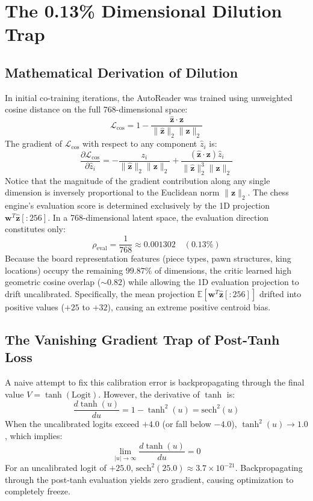 \documentclass[10pt,twocolumn]{article}
\begin{document}
\section{The 0.13\% Dimensional Dilution Trap}

\subsection{Mathematical Derivation of Dilution}
In initial co-training iterations, the AutoReader was trained using unweighted cosine distance on the full 768-dimensional space:
\begin{equation}
    \mathcal{L}_{\text{cos}} = 1 - \frac{\hat{\mathbf{z}} \cdot \mathbf{z}}{\|\hat{\mathbf{z}}\|_2 \|\mathbf{z}\|_2}
\end{equation}
The gradient of $\mathcal{L}_{\text{cos}}$ with respect to any component $\hat{z}_i$ is:
\begin{equation}
    \frac{\partial \mathcal{L}_{\text{cos}}}{\partial \hat{z}_i} = -\frac{z_i}{\|\hat{\mathbf{z}}\|_2 \|\mathbf{z}\|_2} + \frac{(\hat{\mathbf{z}} \cdot \mathbf{z}) \hat{z}_i}{\|\hat{\mathbf{z}}\|_2^3 \|\mathbf{z}\|_2}
\end{equation}
Notice that the magnitude of the gradient contribution along any single dimension is inversely proportional to the Euclidean norm $\|\mathbf{z}\|_2$. The chess engine's evaluation score is determined exclusively by the 1D projection $\mathbf{w}^T \hat{\mathbf{z}}[:256]$. In a 768-dimensional latent space, the evaluation direction constitutes only:
\begin{equation}
    \rho_{\text{eval}} = \frac{1}{768} \approx 0.001302 \quad (0.13\%)
\end{equation}
Because the board representation features (piece types, pawn structures, king locations) occupy the remaining $99.87\%$ of dimensions, the critic learned high geometric cosine overlap ($\sim 0.82$) while allowing the 1D evaluation projection to drift uncalibrated. Specifically, the mean projection $\mathbb{E}[\mathbf{w}^T \hat{\mathbf{z}}[:256]]$ drifted into positive values ($+25$ to $+32$), causing an extreme positive centroid bias.

\subsection{The Vanishing Gradient Trap of Post-Tanh Loss}
A naive attempt to fix this calibration error is backpropagating through the final value $V = \tanh(\text{Logit})$. However, the derivative of $\tanh$ is:
\begin{equation}
    \frac{d \tanh(u)}{du} = 1 - \tanh^2(u) = \text{sech}^2(u)
\end{equation}
When the uncalibrated logits exceed $+4.0$ (or fall below $-4.0$), $\tanh^2(u) \to 1.0$, which implies:
\begin{equation}
    \lim_{|u| \to \infty} \frac{d \tanh(u)}{du} = 0
\end{equation}
For an uncalibrated logit of $+25.0$, $\text{sech}^2(25.0) \approx 3.7 \times 10^{-21}$. Backpropagating through the post-tanh evaluation yields zero gradient, causing optimization to completely freeze.
\end{document}
